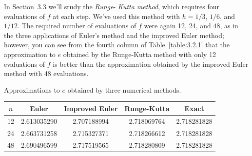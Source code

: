 In Section~3.3 we'll study the
\href{https://mathshistory.st-andrews.ac.uk/Biographies/Runge/}{\color{blue}
\it Runge}-\href{https://mathshistory.st-andrews.ac.uk/Biographies/Kutta/}{\color{blue}
\it Kutta method\/}, which requires four evaluations of $f$ at each step. We've used this method
with $h=1/3$, $1/6$, and $1/12$. The required number of evaluations of $f$ were again 12, 24, and
$48$, as in the three applications of Euler's method and the improved Euler method; however, you can
see from the fourth column of Table~\ref{table:3.2.1} that the approximation to $e$ obtained by the
Runge-Kutta method with only 12 evaluations of $f$ is better than the approximation obtained by the
improved Euler method with 48 evaluations.

\begin{newtable}
  \label{table:3.2.1} Approximations to $e$ obtained by three numerical methods.
  \begin{center}
    \begin{tabular}{|c|c|c|c|c|}
      \hline
      \multicolumn{1}{|c|}{$n$} & \multicolumn{1}{|c|}{Euler} & \multicolumn{1}{|c|}{Improved Euler} & \multicolumn{1}{|c|}{Runge-Kutta} & \multicolumn{1}{|c|}{Exact} \\
      \hline
      12                        & 2.613035290                 & 2.707188994                          & 2.718069764                       & 2.718281828                 \\
      24                        & 2.663731258                 & 2.715327371                          & 2.718266612                       & 2.718281828                 \\
      48                        & 2.690496599                 & 2.717519565                          & 2.718280809                       & 2.718281828                 \\
      \hline
    \end{tabular}
  \end{center}
\end{newtable}



